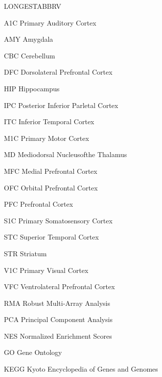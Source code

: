 \begin{theglossary}{LONGESTABBRV}

\item[A1C] Primary Auditory Cortex
\item[AMY] Amygdala
\item[CBC] Cerebellum
\item[DFC] Dorsolateral Prefrontal Cortex
\item[HIP] Hippocampus
\item[IPC] Posterior Inferior Parletal Cortex
\item[ITC] Inferior Temporal Cortex
\item[M1C] Primary Motor Cortex
\item[MD] Mediodorsal Nucleusofthe Thalamus
\item[MFC] Medial Prefrontal Cortex
\item[OFC] Orbital Prefrontal Cortex
\item[PFC] Prefrontal Cortex
\item[S1C] Primary Somatosensory Cortex
\item[STC] Superior Temporal Cortex
\item[STR] Striatum
\item[V1C] Primary Visual Cortex
\item[VFC] Ventrolateral Prefrontal Cortex
\item[RMA] Robust Multi-Array Analysis 
\item[PCA] Principal Component Analysis
\item[NES] Normalized Enrichment Scores
\item[GO] Gene Ontology
\item[KEGG] Kyoto Encyclopedia of Genes and Genomes

\end{theglossary}
